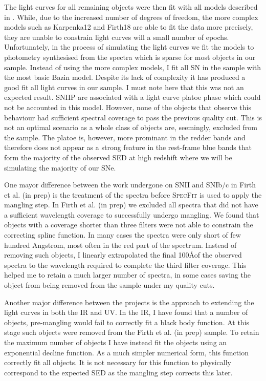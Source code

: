 The light curves for all remaining objects were then fit with all models described in . While, due to the increased number of degrees of freedom, the more complex models such as Karpenka12 and Firth18 are able to fit the data more precisely, they are unable to constrain light curves will a small number of epochs. Unfortunately, in the process of simulating the light curves we fit the models to photometry synthesised from the spectra which is sparse for most objects in our sample. Instead of using the more complex models, I fit all SN in the sample with the most basic Bazin model. Despite its lack of complexity it has produced a good fit all light curves in our sample. I must note here that this was not an expected result. SNIIP are associated with a light curve platoe phase which could not be accounted in this model. However, none of the objects that observe this behaviour had sufficient spectral coverage to pass the previous quality cut. This is not an optimal scenario as a whole class of objects are, seemingly, excluded from the sample. The platoe is, however, more prominant in the redder bands and therefore does not appear as a strong feature in the rest-frame blue bands that form the majority of the observed SED at high redshift where we will be simulating the majority of our SNe.

One mayor difference between the work undergone on SNII and SNIb/c in Firth et al. (in prep) is the treatment of the spectra before \textsc{SpecFit} is used to apply the mangling step. In Firth et al. (in prep) we excluded all spectra that did not have a sufficient wavelength coverage to successfully undergo mangling. We found that objects with a coverage shorter than three filters were not able to constrain the correcting spline function. In many cases the spectra were only short of few hundred Angstrom, most often in the red part of the spectrum. Instead of removing such objects, I linearly extrapolated the final 100\AA of the observed spectra to the wavelength required to complete the third filter coverage. This helped me to retain a much larger number of spectra, in some cases saving the object from being removed from the sample under my quality cuts.

Another major difference between the projects is the approach to extending the light curves in both the IR and UV. In the IR, I have found that a number of objects, pre-mangling would fail to correctly fit a black body function. At this stage such objects were removed from the Firth et al. (in prep) sample. To retain the maximum number of objects I have instead fit the objects using an exponential decline function. As a much simpler numerical form, this function correctly fit all objects. It is not necessary for this function to physically correspond to the expected SED as the mangling step corrects this later.

